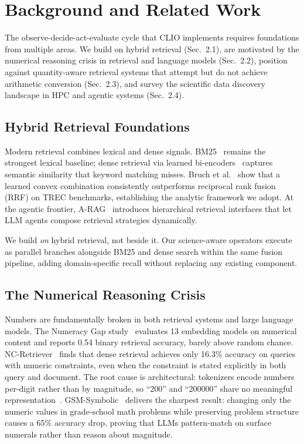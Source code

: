 \section{Background and Related Work}

The observe-decide-act-evaluate cycle that CLIO implements requires foundations from multiple areas. We build on hybrid retrieval (Sec.~2.1), are motivated by the numerical reasoning crisis in retrieval and language models (Sec.~2.2), position against quantity-aware retrieval systems that attempt but do not achieve arithmetic conversion (Sec.~2.3), and survey the scientific data discovery landscape in HPC and agentic systems (Sec.~2.4).

\subsection{Hybrid Retrieval Foundations}

Modern retrieval combines lexical and dense signals. BM25~\cite{robertson2009bm25} remains the strongest lexical baseline; dense retrieval via learned bi-encoders~\cite{karpukhin2020dpr} captures semantic similarity that keyword matching misses. Bruch et al.~\cite{bruch2023fusion} show that a learned convex combination consistently outperforms reciprocal rank fusion (RRF) on TREC benchmarks, establishing the analytic framework we adopt. At the agentic frontier, A-RAG~\cite{arag2026} introduces hierarchical retrieval interfaces that let LLM agents compose retrieval strategies dynamically.

We build \emph{on} hybrid retrieval, not beside it. Our science-aware operators execute as parallel branches alongside BM25 and dense search within the same fusion pipeline, adding domain-specific recall without replacing any existing component.

\subsection{The Numerical Reasoning Crisis}

Numbers are fundamentally broken in both retrieval systems and large language models. The Numeracy Gap study~\cite{numeracygap2026} evaluates 13 embedding models on numerical content and reports 0.54 binary retrieval accuracy, barely above random chance. NC-Retriever~\cite{ncretriever2025} finds that dense retrieval achieves only 16.3\% accuracy on queries with numeric constraints, even when the constraint is stated explicitly in both query and document. The root cause is architectural: tokenizers encode numbers per-digit rather than by magnitude, so ``200'' and ``200000'' share no meaningful representation~\cite{numbers_not_continuous2025}. GSM-Symbolic~\cite{gsmsymbolic2025} delivers the sharpest result: changing only the numeric values in grade-school math problems while preserving problem structure causes a 65\% accuracy drop, proving that LLMs pattern-match on surface numerals rather than reason about magnitude.

